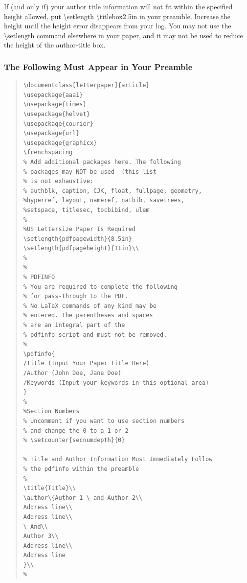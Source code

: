 \documentclass[letterpaper]{article} %
\begin{document}
If (and only if) your author title information will not fit within the specified  height allowed, put \textbackslash setlength \textbackslash titlebox{2.5in} in your preamble. Increase the height until the height error disappears from your log. You may not use the  \textbackslash setlength command elsewhere in your paper, and it may not be used to reduce the height of the author-title box.

\subsubsection{The Following Must Appear in Your Preamble}
\begin{quote}
\begin{scriptsize}\begin{verbatim}
\documentclass[letterpaper]{article}
\usepackage{aaai}
\usepackage{times}
\usepackage{helvet}
\usepackage{courier}
\usepackage{url}
\usepackage{graphicx}
\frenchspacing
% Add additional packages here. The following
% packages may NOT be used  (this list
% is not exhaustive:
% authblk, caption, CJK, float, fullpage, geometry, 
%hyperref, layout, nameref, natbib, savetrees, 
%setspace, titlesec, tocbibind, ulem
%
%US Lettersize Paper Is Required
\setlength{pdfpagewidth}{8.5in}
\setlength{pdfpageheight}{11in}\\
%
%
% PDFINFO
% You are required to complete the following
% for pass-through to the PDF. 
% No LaTeX commands of any kind may be
% entered. The parentheses and spaces 
% are an integral part of the 
% pdfinfo script and must not be removed.
%
\pdfinfo{
/Title (Input Your Paper Title Here)
/Author (John Doe, Jane Doe)
/Keywords (Input your keywords in this optional area)
}
%
%Section Numbers
% Uncomment if you want to use section numbers
% and change the 0 to a 1 or 2
% \setcounter{secnumdepth}{0}

% Title and Author Information Must Immediately Follow
% the pdfinfo within the preamble
%
\title{Title}\\
\author\{Author 1 \ and Author 2\\
Address line\\
Address line\\
\ And\\
Author 3\\
Address line\\
Address line
}\\
%
\end{verbatim}\end{scriptsize}
\end{quote}
\end{document}
